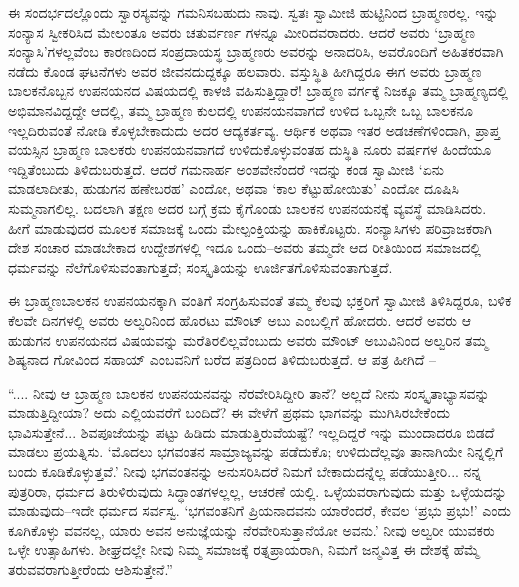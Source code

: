 ಈ ಸಂದರ್ಭದಲ್ಲೊಂದು ಸ್ವಾರಸ್ಯವನ್ನು ಗಮನಿಸಬಹುದು ನಾವು. ಸ್ವತಃ ಸ್ವಾಮೀಜಿ ಹುಟ್ಟಿನಿಂದ ಬ್ರಾಹ್ಮಣರಲ್ಲ. ಇನ್ನು ಸಂನ್ಯಾಸ ಸ್ವೀಕರಿಸಿದ ಮೇಲಂತೂ ಅವರು ಚತುರ್ವರ್ಣ ಗಳನ್ನೂ ಮೀರಿದವರಾದರು. ಆದರೆ ಅವರು ‘ಬ್ರಾಹ್ಮಣ ಸಂನ್ಯಾಸಿ’ಗಳಲ್ಲವೆಂಬ ಕಾರಣದಿಂದ ಸಂಪ್ರದಾಯಸ್ಥ ಬ್ರಾಹ್ಮಣರು ಅವರನ್ನು ಅನಾದರಿಸಿ, ಅವರೊಂದಿಗೆ ಅಹಿತಕರವಾಗಿ ನಡೆದು ಕೊಂಡ ಘಟನೆಗಳು ಅವರ ಜೀವನದುದ್ದಕ್ಕೂ ಹಲವಾರು. ವಸ್ತುಸ್ಥಿತಿ ಹೀಗಿದ್ದರೂ ಈಗ ಅವರು ಬ್ರಾಹ್ಮಣ ಬಾಲಕನೊಬ್ಬನ ಉಪನಯನದ ವಿಷಯದಲ್ಲಿ ಕಾಳಜಿ ವಹಿಸುತ್ತಿದ್ದಾರೆ! ಬ್ರಾಹ್ಮಣ ವರ್ಗಕ್ಕೆ ನಿಜಕ್ಕೂ ತಮ್ಮ ಬ್ರಾಹ್ಮಣ್ಯದಲ್ಲಿ ಅಭಿಮಾನವಿದ್ದದ್ದೇ ಆದಲ್ಲಿ, ತಮ್ಮ ಬ್ರಾಹ್ಮಣ ಕುಲದಲ್ಲಿ ಉಪನಯನವಾಗದೆ ಉಳಿದ ಒಬ್ಬನೇ ಒಬ್ಬ ಬಾಲಕನೂ ಇಲ್ಲದಿರುವಂತೆ ನೋಡಿ ಕೊಳ್ಳಬೇಕಾದುದು ಅದರ ಆದ್ಯಕರ್ತವ್ಯ. ಆರ್ಥಿಕ ಅಥವಾ ಇತರ ಅಡಚಣೆಗಳಿಂದಾಗಿ, ಪ್ರಾಪ್ತ ವಯಸ್ಸಿನ ಬ್ರಾಹ್ಮಣ ಬಾಲಕರು ಉಪನಯನವಾಗದೆ ಉಳಿದುಕೊಳ್ಳುವಂತಹ ದುಸ್ಥಿತಿ ನೂರು ವರ್ಷಗಳ ಹಿಂದೆಯೂ ಇದ್ದಿತೆಂಬುದು ತಿಳಿದುಬರುತ್ತದೆ. ಆದರೆ ಗಮನಾರ್ಹ ಅಂಶವೇನೆಂದರೆ ಇದನ್ನು ಕಂಡ ಸ್ವಾಮೀಜಿ ‘ಏನು ಮಾಡಲಾದೀತು, ಹುಡುಗನ ಹಣೇಬರಹ’ ಎಂದೋ, ಅಥವಾ ‘ಕಾಲ ಕೆಟ್ಟುಹೋಯಿತು’ ಎಂದೋ ದೂಷಿಸಿ ಸುಮ್ಮನಾಗಲಿಲ್ಲ. ಬದಲಾಗಿ ತಕ್ಷಣ ಅದರ ಬಗ್ಗೆ ಕ್ರಮ ಕೈಗೊಂಡು ಬಾಲಕನ ಉಪನಯನಕ್ಕೆ ವ್ಯವಸ್ಥೆ ಮಾಡಿಸಿದರು. ಹೀಗೆ ಮಾಡುವುದರ ಮೂಲಕ ಸಮಾಜಕ್ಕೆ ಒಂದು ಮೇಲ್ಪಂಕ್ತಿಯನ್ನು ಹಾಕಿಕೊಟ್ಟರು. ಸಂನ್ಯಾಸಿಗಳು ಪರಿವ್ರಾಜಕರಾಗಿ ದೇಶ ಸಂಚಾರ ಮಾಡಬೇಕಾದ ಉದ್ದೇಶಗಳಲ್ಲಿ ಇದೂ ಒಂದು–ಅವರು ತಮ್ಮದೇ ಆದ ರೀತಿಯಿಂದ ಸಮಾಜದಲ್ಲಿ ಧರ್ಮವನ್ನು ನೆಲೆಗೊಳಿಸುವಂತಾಗುತ್ತದೆ; ಸಂಸ್ಕೃತಿಯನ್ನು ಊರ್ಜಿತಗೊಳಿಸುವಂತಾಗುತ್ತದೆ.

ಈ ಬ್ರಾಹ್ಮಣಬಾಲಕನ ಉಪನಯನಕ್ಕಾಗಿ ವಂತಿಗೆ ಸಂಗ್ರಹಿಸುವಂತೆ ತಮ್ಮ ಕೆಲವು ಭಕ್ತರಿಗೆ ಸ್ವಾಮೀಜಿ ತಿಳಿಸಿದ್ದರೂ, ಬಳಿಕ ಕೆಲವೇ ದಿನಗಳಲ್ಲಿ ಅವರು ಅಲ್ವರಿನಿಂದ ಹೊರಟು ಮೌಂಟ್ ಅಬು ಎಂಬಲ್ಲಿಗೆ ಹೋದರು. ಆದರೆ ಅವರು ಆ ಹುಡುಗನ ಉಪನಯನದ ವಿಷಯವನ್ನು ಮರೆತಿರಲಿಲ್ಲವೆಂಬುದು ಅವರು ಮೌಂಟ್ ಅಬುವಿನಿಂದ ಅಲ್ವರಿನ ತಮ್ಮ ಶಿಷ್ಯನಾದ ಗೋವಿಂದ ಸಹಾಯ್ ಎಂಬವನಿಗೆ ಬರೆದ ಪತ್ರದಿಂದ ತಿಳಿದುಬರುತ್ತದೆ. ಆ ಪತ್ರ ಹೀಗಿದೆ –

“.... ನೀವು ಆ ಬ್ರಾಹ್ಮಣ ಬಾಲಕನ ಉಪನಯನವನ್ನು ನೆರವೇರಿಸಿದ್ದೀರಿ ತಾನೆ? ಅಲ್ಲದೆ ನೀನು ಸಂಸ್ಕೃತಾಭ್ಯಾಸವನ್ನು ಮಾಡುತ್ತಿದ್ದೀಯಾ? ಅದು ಎಲ್ಲಿಯವರೆಗೆ ಬಂದಿದೆ? ಈ ವೇಳೆಗೆ ಪ್ರಥಮ ಭಾಗವನ್ನು ಮುಗಿಸಿರಬೇಕೆಂದು ಭಾವಿಸುತ್ತೇನೆ... ಶಿವಪೂಜೆಯನ್ನು ಪಟ್ಟು ಹಿಡಿದು ಮಾಡುತ್ತಿರುವೆಯಷ್ಟೆ? ಇಲ್ಲದಿದ್ದರೆ ಇನ್ನು ಮುಂದಾದರೂ ಬಿಡದೆ ಮಾಡಲು ಪ್ರಯತ್ನಿಸು. ‘ಮೊದಲು ಭಗವಂತನ ಸಾಮ್ರಾಜ್ಯವನ್ನು ಪಡೆದುಕೊ; ಉಳಿದುದೆಲ್ಲವೂ ತಾನಾಗಿಯೇ ನಿನ್ನಲ್ಲಿಗೆ ಬಂದು ಕೂಡಿಕೊಳ್ಳುತ್ತವೆ.’ ನೀವು ಭಗವಂತನನ್ನು ಅನುಸರಿಸಿದರೆ ನಿಮಗೆ ಬೇಕಾದುದನ್ನೆಲ್ಲ ಪಡೆಯುತ್ತೀರಿ... ನನ್ನ ಪುತ್ರರಿರಾ, ಧರ್ಮದ ತಿರುಳಿರುವುದು ಸಿದ್ಧಾಂತಗಳಲ್ಲಲ್ಲ, ಆಚರಣೆ ಯಲ್ಲಿ. ಒಳ್ಳೆಯವರಾಗುವುದು ಮತ್ತು ಒಳ್ಳೆಯದನ್ನು ಮಾಡುವುದು–ಇದೇ ಧರ್ಮದ ಸರ್ವಸ್ವ. ‘ಭಗವಂತನಿಗೆ ಪ್ರಿಯನಾದವನು ಯಾರೆಂದರೆ, ಕೇವಲ ‘ಪ್ರಭು ಪ್ರಭು!’ ಎಂದು ಕೂಗಿಕೊಳ್ಳು ವವನಲ್ಲ, ಯಾರು ಅವನ ಅನುಜ್ಞೆಯನ್ನು ನೆರವೇರಿಸುತ್ತಾನೆಯೋ ಅವನು.’ ನೀವು ಅಲ್ವರೀ ಯುವಕರು ಒಳ್ಳೇ ಉತ್ಸಾಹಿಗಳು. ಶೀಘ್ರದಲ್ಲೇ ನೀವು ನಿಮ್ಮ ಸಮಾಜಕ್ಕೆ ರತ್ನಪ್ರಾಯರಾಗಿ, ನಿಮಗೆ ಜನ್ಮವಿತ್ತ ಈ ದೇಶಕ್ಕೆ ಹೆಮ್ಮೆ ತರುವವರಾಗುತ್ತೀರೆಂದು ಆಶಿಸುತ್ತೇನೆ.”

